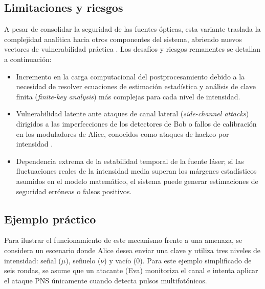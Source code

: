 \subsection{Limitaciones y riesgos}
A pesar de consolidar la seguridad de las fuentes ópticas, esta variante traslada la complejidad analítica hacia otros componentes del sistema, abriendo nuevos vectores de vulnerabilidad práctica \citep{scarani2009, lydersen2010}. Los desafíos y riesgos remanentes se detallan a continuación:
\begin{itemize}
    \item Incremento en la carga computacional del postprocesamiento debido a la necesidad de resolver ecuaciones de estimación estadística y análisis de clave finita (\emph{finite-key analysis}) más complejas para cada nivel de intensidad.
    \item Vulnerabilidad latente ante ataques de canal lateral (\emph{side-channel attacks}) dirigidos a las imperfecciones de los detectores de Bob o fallos de calibración en los moduladores de Alice, conocidos como ataques de hackeo por intensidad \citep{lydersen2010}.
    \item Dependencia extrema de la estabilidad temporal de la fuente láser; si las fluctuaciones reales de la intensidad media superan los márgenes estadísticos asumidos en el modelo matemático, el sistema puede generar estimaciones de seguridad erróneas o falsos positivos.
\end{itemize}

\subsection{Ejemplo práctico}
Para ilustrar el funcionamiento de este mecanismo frente a una amenaza, se considera un escenario donde Alice desea enviar una clave y utiliza tres niveles de intensidad: señal ($\mu$), señuelo ($\nu$) y vacío ($0$). Para este ejemplo simplificado de seis rondas, se asume que un atacante (Eva) monitoriza el canal e intenta aplicar el ataque PNS únicamente cuando detecta pulsos multifotónicos.


